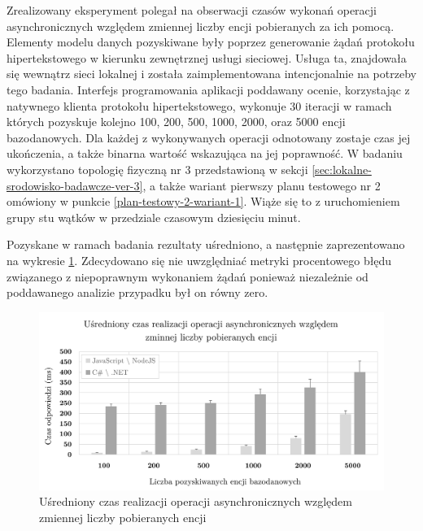 Zrealizowany eksperyment polegał na obserwacji czasów wykonań operacji asynchronicznych względem zmiennej liczby encji pobieranych za ich pomocą. Elementy modelu danych pozyskiwane były poprzez generowanie żądań protokołu hipertekstowego w kierunku zewnętrznej usługi sieciowej. Usługa ta, znajdowała się wewnątrz sieci lokalnej i została zaimplementowana intencjonalnie na potrzeby tego badania. Interfejs programowania aplikacji poddawany ocenie, korzystając z natywnego klienta protokołu hipertekstowego, wykonuje 30 iteracji w ramach których pozyskuje kolejno 100, 200, 500, 1000, 2000, oraz 5000 encji bazodanowych. Dla każdej z wykonywanych operacji odnotowany zostaje czas jej ukończenia, a także binarna wartość wskazująca na jej poprawność. W badaniu wykorzystano topologię fizyczną nr 3 przedstawioną w sekcji \ref{sec:lokalne-srodowisko-badawcze-ver-3}, a także wariant pierwszy planu testowego nr 2 omówiony w punkcie \ref{plan-testowy-2-wariant-1}. Wiąże się to z uruchomieniem grupy stu wątków w przedziale czasowym dziesięciu minut.

Pozyskane w ramach badania rezultaty uśredniono, a następnie zaprezentowano na wykresie \ref{fig:async-times}. Zdecydowano się nie uwzględniać metryki procentowego błędu związanego z niepoprawnym wykonaniem żądań ponieważ niezależnie od poddawanego analizie przypadku był on równy zero.

\begin{figure}[H]
  \centering
   \includegraphics[width=\linewidth]{rys05/async-times.pdf}
  \caption{Uśredniony czas realizacji operacji asynchronicznych względem zmiennej liczby pobieranych encji}
  \label{fig:async-times}
\end{figure}

